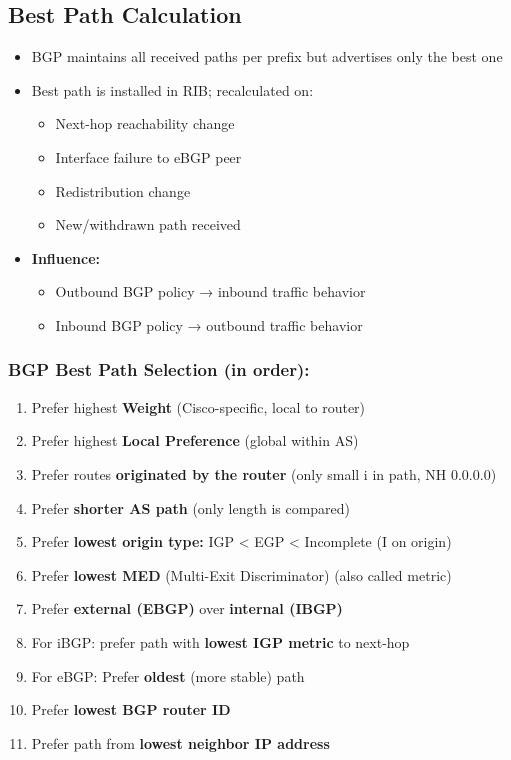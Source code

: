 \begin{multicols*}{5}
		\subsection{Best Path Calculation}
		\begin{itemize}
			\item BGP maintains all received paths per prefix but advertises only the best one
			\item Best path is installed in RIB; recalculated on:
			\begin{itemize}
				\item Next-hop reachability change
				\item Interface failure to eBGP peer
				\item Redistribution change
				\item New/withdrawn path received
			\end{itemize}
			\item \textbf{Influence:}
			\begin{itemize}
				\item Outbound BGP policy → inbound traffic behavior
				\item Inbound BGP policy → outbound traffic behavior
			\end{itemize}
		\end{itemize}
		
		\subsubsection*{BGP Best Path Selection (in order):}
		\begin{enumerate}
			\item Prefer highest \textbf{Weight} (Cisco-specific, local to router)
			\item Prefer highest \textbf{Local Preference} (global within AS)
			\item Prefer routes \textbf{originated by the router} (only small i in path, NH 0.0.0.0)
			\item Prefer \textbf{shorter AS path} (only length is compared) 
			\item Prefer \textbf{lowest origin type:} IGP < EGP < Incomplete (I on origin)
			\item Prefer \textbf{lowest MED} (Multi-Exit Discriminator) (also called metric)
			\item Prefer \textbf{external (EBGP)} over \textbf{internal (IBGP)}
			\item For iBGP: prefer path with \textbf{lowest IGP metric} to next-hop
			\item For eBGP: Prefer \textbf{oldest} (more stable) path
			\item Prefer \textbf{lowest BGP router ID}
			\item Prefer path from \textbf{lowest neighbor IP address}
		\end{enumerate}
		

\end{multicols*}
